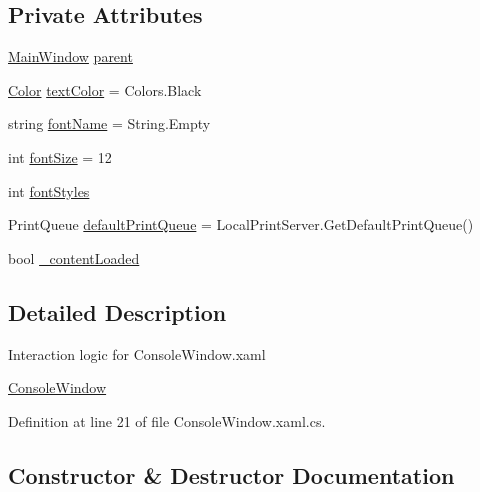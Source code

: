 \subsection*{Private Attributes}
\begin{DoxyCompactItemize}
\item 
\hyperlink{class_c_p_u___o_s___simulator_1_1_main_window}{Main\+Window} \hyperlink{class_c_p_u___o_s___simulator_1_1_console_window_a1e38326bb40f4ed44c4964d94dc6f809}{parent}
\item 
\hyperlink{_console_window_8xaml_8cs_adf2800823d988ace598d734fdec29975}{Color} \hyperlink{class_c_p_u___o_s___simulator_1_1_console_window_a155c42bee25bd537a2656828bdf6f527}{text\+Color} = Colors.\+Black
\item 
string \hyperlink{class_c_p_u___o_s___simulator_1_1_console_window_a78375ad950278e847c76e7de38aa1e31}{font\+Name} = String.\+Empty
\item 
int \hyperlink{class_c_p_u___o_s___simulator_1_1_console_window_a0c319b98b649d11ffa185590e771cbb1}{font\+Size} = 12
\item 
int \hyperlink{class_c_p_u___o_s___simulator_1_1_console_window_abe8a7e3f2f861cd266a24426b2ffbc1c}{font\+Styles}
\item 
Print\+Queue \hyperlink{class_c_p_u___o_s___simulator_1_1_console_window_adec14e0c1003b5d40bb517cf834d6584}{default\+Print\+Queue} = Local\+Print\+Server.\+Get\+Default\+Print\+Queue()
\item 
bool \hyperlink{class_c_p_u___o_s___simulator_1_1_console_window_a4836f04e93faa3749609d7eba72e1712}{\+\_\+content\+Loaded}
\end{DoxyCompactItemize}


\subsection{Detailed Description}
Interaction logic for Console\+Window.\+xaml 

\hyperlink{class_c_p_u___o_s___simulator_1_1_console_window}{Console\+Window} 

Definition at line 21 of file Console\+Window.\+xaml.\+cs.



\subsection{Constructor \& Destructor Documentation}
\hypertarget{class_c_p_u___o_s___simulator_1_1_console_window_abdd222b591f72c19297dc5805059ee7e}{}
